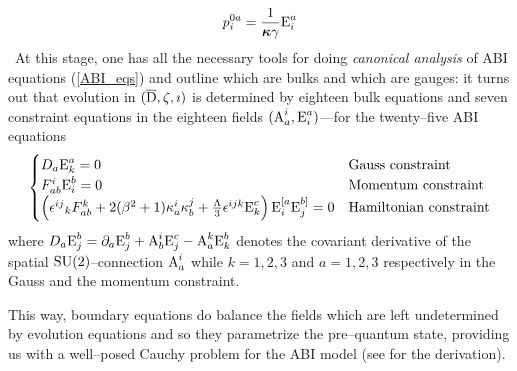 \begin{equation}\label{conj_momenta_holst}
    p_i^{0a}=\frac{1}{\boldsymbol{\kappa}\gamma}\text{\normalfont E}^a_i
\end{equation}
\,\newline
At this stage, one has all the necessary tools for doing \emph{canonical analysis} of ABI equations (\ref{ABI_eqs}) and outline which are bulks and which are gauges: it turns out that evolution in $(\overline{\text{\normalfont D}},\zeta,\imath)$ is determined by eighteen bulk equations and seven constraint equations in the eighteen fields $(\text{\normalfont A}^i_a,\text{\normalfont E}^a_i)$---for the twenty--five ABI equations
\begin{equation}\label{ABI_boundary_eqs}
    \begin{cases}
        D_a\text{\normalfont E}_k^a=0&\text{Gauss constraint}\\
        F^i_{ab}\text{\normalfont E}^b_i=0&\text{Momentum constraint}\\
        \left({\epsilon^{ij}}_kF^k_{ab}+2(\beta^2+1)\kappa^i_a\kappa^j_b+\frac{\Lambda}{3}\epsilon^{ijk}\text{\normalfont E}^c_k\right)\text{\normalfont E}^{[a}_i\text{\normalfont E}^{b]}_j =0&\text{Hamiltonian constraint}\\
    \end{cases}
\end{equation}
where $D_a\text{\normalfont E}^b_j=\partial_a\text{\normalfont E}^b_j+\text{\normalfont A}_b^i\text{\normalfont E}_j^c-\text{\normalfont A}^k_a\text{\normalfont E}_k^b$ denotes the covariant derivative of the spatial $\text{\normalfont SU}(2)$--connection $\text{\normalfont A}_a^i$ while $k=1,2,3$ and $a=1,2,3$ respectively in the Gauss and the momentum constraint. 

This way, boundary equations do balance the fields which are left undetermined by evolution equations and so they parametrize the pre--quantum state, providing us with a well--posed Cauchy problem for the ABI model (see \cite{LN3} for the derivation).\\

